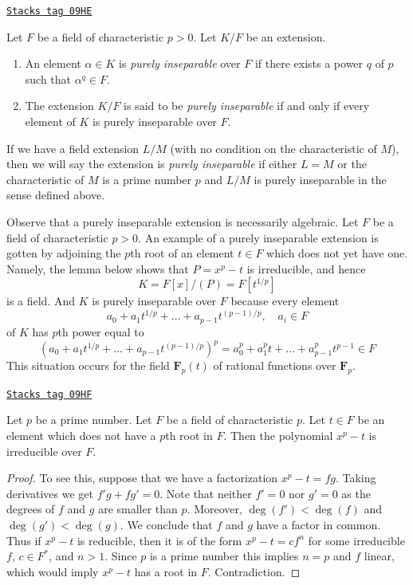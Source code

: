 \begin{definition}
\label{fields-definition-purely-inseparable}
\href{https://stacks.math.columbia.edu/tag/09HE}{\texttt{Stacks tag 09HE}}

Let $F$ be a field of characteristic $p > 0$. Let $K/F$ be an extension.
\begin{enumerate}
\item An element $\alpha \in K$ is {\it purely inseparable} over $F$
if there exists a power $q$ of $p$ such that $\alpha^q \in F$.
\item The extension $K/F$ is said to be {\it purely inseparable}
if and only if every element of $K$ is purely inseparable over $F$.
\end{enumerate}
If we have a field extension $L/M$ (with no condition on the characteristic
of $M$), then we will say the extension is {\it purely inseparable}
if either $L = M$ or the characteristic of $M$ is a prime number $p$
and $L/M$ is purely inseparable in the sense defined above.
\end{definition}

Observe that a purely inseparable extension is necessarily algebraic.
Let $F$ be a field of characteristic $p > 0$.
An example of a purely inseparable extension is gotten by adjoining
the $p$th root of an element $t \in F$ which does not yet have one. Namely,
the lemma below shows that $P = x^p - t$ is irreducible, and hence
$$
K = F[x]/(P) = F[t^{1/p}]
$$
is a field. And $K$ is purely inseparable over $F$ because every element
$$
a_0 + a_1t^{1/p} + \ldots + a_{p - 1}t^{(p - 1)/p},\quad a_i \in F
$$
of $K$ has $p$th power equal to
$$
(a_0 + a_1t^{1/p} + \ldots + a_{p - 1}t^{(p - 1)/p})^p =
a_0^p + a_1^p t + \ldots + a_{p - 1}^pt^{p - 1} \in F
$$
This situation occurs for the field
$\mathbf{F}_p(t)$ of rational functions over $\mathbf{F}_p$.

\begin{lemma}
\label{fields-lemma-take-pth-root}
\href{https://stacks.math.columbia.edu/tag/09HF}{\texttt{Stacks tag 09HF}}

Let $p$ be a prime number. Let $F$ be a field of characteristic $p$.
Let $t \in F$ be an element which does not have a $p$th root in $F$.
Then the polynomial $x^p - t$ is irreducible over $F$.
\end{lemma}

\begin{proof}
To see this, suppose that we have a factorization
$x^p - t = f g$. Taking derivatives we get $f' g + f g' = 0$.
Note that neither $f' = 0$ nor $g' = 0$ as the degrees of $f$ and $g$
are smaller than $p$. Moreover, $\deg(f') < \deg(f)$ and $\deg(g') < \deg(g)$.
We conclude that $f$ and $g$ have a factor in common. Thus if $x^p - t$
is reducible, then it is of the form $x^p - t = c f^n$ for some irreducible
$f$, $c \in F^*$, and $n > 1$. Since $p$ is a prime number this
implies $n = p$ and $f$ linear, which would imply $x^p - t$ has a root
in $F$. Contradiction.
\end{proof}

